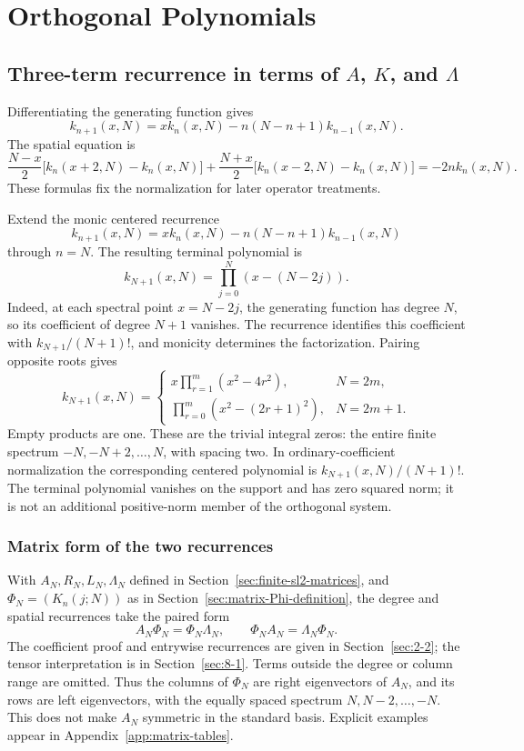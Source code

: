 \chapter{Orthogonal Polynomials}
\label{ch:13}
\section{Three-term recurrence in terms of $A$, $K$, and $\Lambda$}
\label{sec:13-1}
Differentiating the generating function gives
\[
k_{n+1}(x,N)=xk_n(x,N)-n(N-n+1)k_{n-1}(x,N).
\]
The spatial equation is
\[
\frac{N-x}{2}\bigl[k_n(x+2,N)-k_n(x,N)\bigr]
+\frac{N+x}{2}\bigl[k_n(x-2,N)-k_n(x,N)\bigr]
=-2n k_n(x,N).
\]
These formulas fix the normalization for later operator treatments.


\begin{remark}
\label{rem:terminal-integral-zeros}
Extend the monic centered recurrence
\[
k_{n+1}(x,N)=xk_n(x,N)-n(N-n+1)k_{n-1}(x,N)
\]
through $n=N$. The resulting terminal polynomial is
\[
k_{N+1}(x,N)=\prod_{j=0}^{N}(x-(N-2j)).
\]
Indeed, at each spectral point $x=N-2j$, the generating function has degree $N$, so its coefficient of degree $N+1$ vanishes. The recurrence identifies this coefficient with $k_{N+1}/(N+1)!$, and monicity determines the factorization. Pairing opposite roots gives
\[
k_{N+1}(x,N)=
\begin{cases}
x\displaystyle\prod_{r=1}^{m}(x^2-4r^2),&N=2m,\\
\displaystyle\prod_{r=0}^{m}(x^2-(2r+1)^2),&N=2m+1.
\end{cases}
\]
Empty products are one. These are the trivial integral zeros: the entire finite spectrum $-N,-N+2,\ldots,N$, with spacing two. In ordinary-coefficient normalization the corresponding centered polynomial is $k_{N+1}(x,N)/(N+1)!$. The terminal polynomial vanishes on the support and has zero squared norm; it is not an additional positive-norm member of the orthogonal system.
\end{remark}

\subsection{Matrix form of the two recurrences}
\label{sec:matrix-recurrence-intertwining}
With $A_N,R_N,L_N,\Lambda_N$ defined in
Section~\ref{sec:finite-sl2-matrices}, and
$\Phi_N=(K_n(j;N))$ as in
Section~\ref{sec:matrix-Phi-definition}, the degree and spatial
recurrences take the paired form
\begin{equation}\label{eq:ency-intertwining}
A_N\Phi_N=\Phi_N\Lambda_N,\qquad
\Phi_NA_N=\Lambda_N\Phi_N.
\end{equation}
The coefficient proof and entrywise recurrences are given in
Section~\ref{sec:2-2}; the tensor interpretation is in
Section~\ref{sec:8-1}.
Terms outside the degree or column range are omitted.
Thus the columns of $\Phi_N$ are right eigenvectors of $A_N$,
and its rows are left eigenvectors, with the equally spaced spectrum
$N,N-2,\ldots,-N$. This does not make $A_N$ symmetric in the
standard basis. Explicit examples appear in
Appendix~\ref{app:matrix-tables}.

